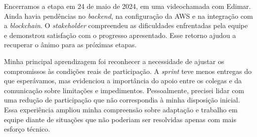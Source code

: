 Encerramos a etapa em 24 de maio de 2024, em uma videochamada com Edimar. Ainda havia pendências no \textit{backend}, na configuração da \ac{AWS} e na integração com a \textit{blockchain}. O \textit{stakeholder} compreendeu as dificuldades enfrentadas pela equipe e demonstrou satisfação com o progresso apresentado. Esse retorno ajudou a recuperar o ânimo para as próximas etapas.

Minha principal aprendizagem foi reconhecer a necessidade de ajustar os compromissos às condições reais de participação. A \textit{sprint} teve menos entregas do que esperávamos, mas evidenciou a importância do apoio entre os colegas e da comunicação sobre limitações e impedimentos. Pessoalmente, precisei lidar com uma redução de participação que não correspondia à minha disposição inicial. Essa experiência ampliou minha compreensão sobre adaptação e trabalho em equipe diante de situações que não poderiam ser resolvidas apenas com mais esforço técnico.
